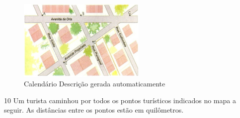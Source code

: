\begin{escolha}
\begin{boxmedio}
\begin{boxmedio}
{\begin{boxpeq}
\begin{boxpeq}
{\begin{boxpeq}
\begin{boxmedio}
\begin{boxmedio}
\begin{boxpeq}
\begin{boxmedio}
\begin{boxpeq}
\begin{boxpeq}
\begin{boxpeq}
\begin{boxpeq}
\begin{boxmedio}
{\begin{boxmedio}
\begin{boxmedio}
\begin{boxpeq}
\begin{boxmedio}
\begin{boxpeq}
\begin{boxpeq}
\begin{boxpeq}
\begin{escolha}
{\begin{boxmedio}
\begin{boxpeq}
\begin{boxpeq}
\begin{boxpeq}
\begin{boxpeq}
\begin{boxpeq}
\begin{boxmedio}
\begin{boxpeq}
\begin{boxpeq}
\begin{boxpeq}
{\begin{boxpeq}
\begin{boxmedio}
\begin{boxpeq}
\begin{boxpeq}
\begin{boxpeq}
{\begin{boxpeq}
\begin{boxmedio}
{\begin{boxpeq}
\begin{boxpeq}
\begin{boxmedio}
\begin{boxmedio}
\begin{boxpeq}
\begin{boxpeq}
{\begin{boxpeq}
\begin{boxpeq}
\begin{boxpeq}
\begin{boxpeq}
\begin{boxpeq}
\begin{escolha}
\begin{escolha}
{\begin{boxmedio}
\begin{boxpeq}
\begin{q°}
\begin{boxmedio}
\begin{boxpeq}
\begin{boxpeq}
\begin{boxmedio}
\begin{boxmedio}
\begin{boxmedio}
\begin{figure}
\centering
\includegraphics[width=2.40278in,height=1.53858in]{./_SAEB_9_MAT/media/image209.jpeg}
\caption{Calendário Descrição gerada automaticamente}
\end{figure}



\num{10} Um turista caminhou por todos os pontos turísticos indicados no mapa a seguir.
As distâncias entre os pontos estão em quilômetros.


\end{boxmedio}
\end{boxmedio}
\end{boxmedio}
\end{boxpeq}
\end{boxpeq}
\end{boxmedio}
\end{q°}
\end{boxpeq}
\end{boxmedio}}
\end{escolha}
\end{escolha}
\end{boxpeq}
\end{boxpeq}
\end{boxpeq}
\end{boxpeq}
\end{boxpeq}}
\end{boxpeq}
\end{boxpeq}
\end{boxmedio}
\end{boxmedio}
\end{boxpeq}
\end{boxpeq}}
\end{boxmedio}
\end{boxpeq}}
\end{boxpeq}
\end{boxpeq}
\end{boxpeq}
\end{boxmedio}
\end{boxpeq}}
\end{boxpeq}
\end{boxpeq}
\end{boxpeq}
\end{boxmedio}
\end{boxpeq}
\end{boxpeq}
\end{boxpeq}
\end{boxpeq}
\end{boxpeq}
\end{boxmedio}}
\end{escolha}
\end{boxpeq}
\end{boxpeq}
\end{boxpeq}
\end{boxmedio}
\end{boxpeq}
\end{boxmedio}
\end{boxmedio}}
\end{boxmedio}
\end{boxpeq}
\end{boxpeq}
\end{boxpeq}
\end{boxpeq}
\end{boxmedio}
\end{boxpeq}
\end{boxmedio}
\end{boxmedio}
\end{boxpeq}}
\end{boxpeq}
\end{boxpeq}}
\end{boxmedio}
\end{boxmedio}
\end{escolha}
